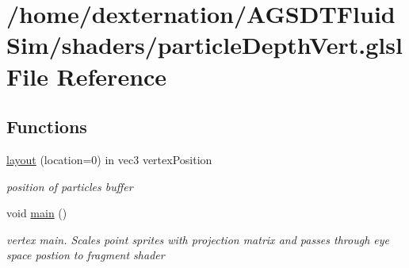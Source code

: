 \hypertarget{particle_depth_vert_8glsl}{\section{/home/dexternation/\-A\-G\-S\-D\-T\-Fluid\-Sim/shaders/particle\-Depth\-Vert.glsl File Reference}
\label{particle_depth_vert_8glsl}
}
\subsection*{Functions}
\begin{DoxyCompactItemize}
\item 
\hypertarget{particle_depth_vert_8glsl_a3a9bed495f596aa8aed4121aacc43fdd}{\hyperlink{particle_depth_vert_8glsl_a3a9bed495f596aa8aed4121aacc43fdd}{layout} (location=0) in vec3 vertex\-Position}\label{particle_depth_vert_8glsl_a3a9bed495f596aa8aed4121aacc43fdd}

\begin{DoxyCompactList}\small\item\em position of particles buffer \end{DoxyCompactList}\item 
\hypertarget{particle_depth_vert_8glsl_acdef7a1fd863a6d3770c1268cb06add3}{void \hyperlink{particle_depth_vert_8glsl_acdef7a1fd863a6d3770c1268cb06add3}{main} ()}\label{particle_depth_vert_8glsl_acdef7a1fd863a6d3770c1268cb06add3}

\begin{DoxyCompactList}\small\item\em vertex main. Scales point sprites with projection matrix and passes through eye space postion to fragment shader \end{DoxyCompactList}\end{DoxyCompactItemize}
